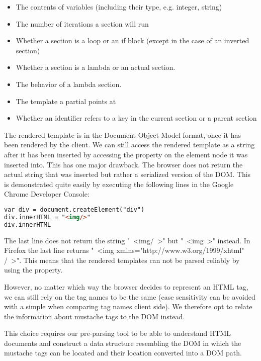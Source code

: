 \begin{itemize}
\item The contents of variables (including their type, e.g. integer, string)
\item The number of iterations a section will run
\item Whether a section is a loop or an if block
      (except in the case of an inverted section)
\item Whether a section is a lambda or an actual section.
\item The behavior of a lambda section.
\item The template a partial points at
\item Whether an identifier refers to a key in the current section or
      a parent section
\end{itemize}

The rendered template is in the Document Object Model format, once it has
been rendered by the client. We can still access the rendered template as a
string after it has been inserted by accessing the  property
on the element node it was inserted into. This has one major drawback.
The browser does not return the actual string that was inserted but rather a
serialized version of the DOM. This is demonstrated quite easily by executing
the following lines in the Google Chrome Developer Console:
\begin{lstlisting}[language=HTML]
var div = document.createElement("div")
div.innerHTML = "<img/>"
div.innerHTML
\end{lstlisting}

The last line does not return the string "\ <img/\ >" but "\ <img\ >" instead.
In Firefox the last line returns "\ <img xmlns="http://www.w3.org/1999/xhtml" /\ >".
This means that the rendered templates can not be parsed reliably by using the
 property.

However, no matter which way the browser decides to represent an HTML tag,
we can still rely on the tag names to be the same
(case sensitivity can be avoided with a simple
 when comparing tag names client side).
We therefore opt to relate the information about mustache tags to the DOM instead.

This choice requires our pre-parsing tool to be able to understand
HTML documents and construct a data structure resembling the DOM in which the
mustache tags can be located and their location converted into a DOM path.

